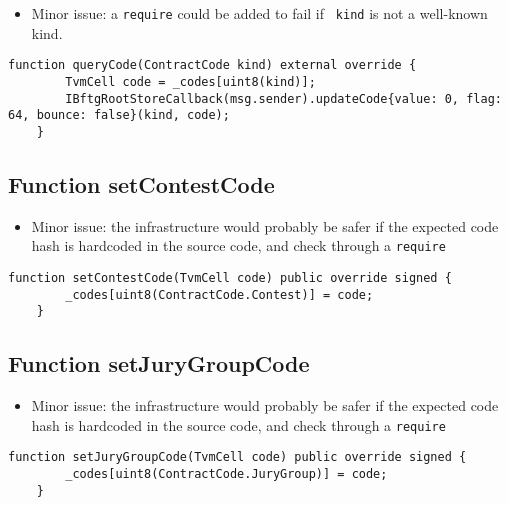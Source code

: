 \begin{itemize}
\item Minor issue: a {\tt require} could be added to fail if {\tt
  kind} is not a well-known kind.
\end{itemize}

\begin{lstlisting}[firstnumber=21]
    function queryCode(ContractCode kind) external override {
        TvmCell code = _codes[uint8(kind)];
        IBftgRootStoreCallback(msg.sender).updateCode{value: 0, flag: 64, bounce: false}(kind, code);
    }
\end{lstlisting}

\subsection{Function setContestCode}

\begin{itemize}
\item Minor issue: the infrastructure would probably be safer if the
  expected code hash is hardcoded in the source code, and check
  through a {\tt require}
\end{itemize}

\begin{lstlisting}[firstnumber=17]
    function setContestCode(TvmCell code) public override signed {
        _codes[uint8(ContractCode.Contest)] = code;
    }
\end{lstlisting}

\subsection{Function setJuryGroupCode}

\begin{itemize}
\item Minor issue: the infrastructure would probably be safer if the
  expected code hash is hardcoded in the source code, and check
  through a {\tt require}
\end{itemize}

\begin{lstlisting}[firstnumber=13]
    function setJuryGroupCode(TvmCell code) public override signed {
        _codes[uint8(ContractCode.JuryGroup)] = code;
    }
\end{lstlisting}
